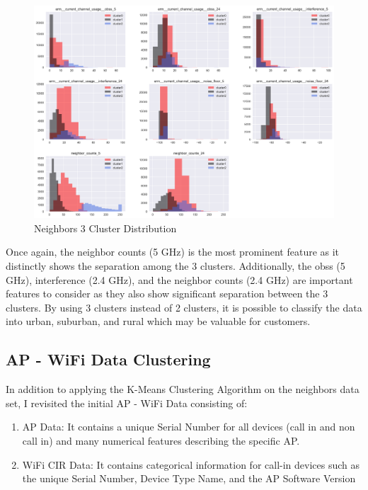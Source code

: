 \documentclass{article}
\begin{document}
\begin{figure}[htp]
    \centering
    \includegraphics[width=14cm]{visuals/neighbors (3 clusters).png}
    \caption{Neighbors 3 Cluster Distribution}
\end{figure}

\noindent
Once again, the neighbor counts (5 GHz) is the most prominent feature as it distinctly shows the separation among the 3 clusters. Additionally, the obss (5 GHz), interference (2.4 GHz), and the neighbor counts (2.4 GHz) are important features to consider as they also show significant separation between the 3 clusters. By using 3 clusters instead of 2 clusters, it is possible to classify the data into urban, suburban, and rural which may be valuable for customers.


\newpage

\subsection{AP - WiFi Data Clustering}

In addition to applying the K-Means Clustering Algorithm on the neighbors data set, I revisited the initial AP - WiFi Data consisting of:

\begin{enumerate}
    \item AP Data: It contains a unique Serial Number for all devices (call in and non call in) and many numerical features describing the specific AP. 
    \item WiFi CIR Data: It contains categorical information for call-in devices such as the unique Serial Number, Device Type Name, and the AP Software Version
\end{enumerate}
\end{document}

